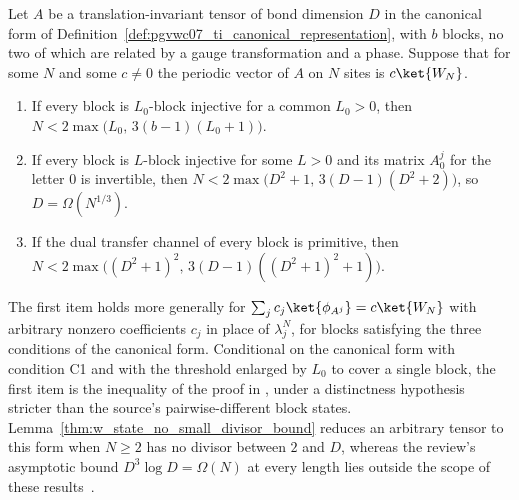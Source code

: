 \begin{lemma}%
    \label{thm:w_state_canonical_bound}
    \leanok
    Let $A$ be a translation-invariant tensor of bond dimension $D$ in the
    canonical form of Definition~\ref{def:pgvwc07_ti_canonical_representation},
    with $b$ blocks, no two of which are related by a gauge transformation and a
    phase. Suppose that for some $N$ and some $c\neq0$ the periodic vector of $A$
    on $N$ sites is $c\ket{W_N}$.
    \begin{enumerate}
        \item If every block is $L_0$-block injective for a common $L_0>0$, then
              $N<2\max\bigl(L_0,\,3(b-1)(L_0+1)\bigr)$.
        \item If every block is $L$-block injective for some $L>0$ and its matrix $A_0^j$ for the letter $0$ is invertible, then
              $N<2\max\bigl(D^2+1,\,3(D-1)(D^2+2)\bigr)$, so $D=\Omega(N^{1/3})$.
        \item If the dual transfer channel of every block is primitive, then
              $N<2\max\bigl((D^2+1)^2,\,3(D-1)((D^2+1)^2+1)\bigr)$.
    \end{enumerate}
    The first item holds more generally for $\sum_jc_j\ket{\phi_{A^j}}=c\ket{W_N}$
    with arbitrary nonzero coefficients $c_j$ in place of $\lambda_j^N$, for blocks
    satisfying the three conditions of the canonical form.
    Conditional on the canonical form with condition C1 and with the threshold
    enlarged by $L_0$ to cover a single block, the first item is the
    inequality of the proof in \cite{PerezGarcia2007Matrix}, under a
    distinctness hypothesis stricter than the source's pairwise-different
    block states. Lemma~\ref{thm:w_state_no_small_divisor_bound} reduces an
    arbitrary tensor to this form when $N\geq2$ has no divisor between $2$ and
    $D$, whereas the review's asymptotic bound $D^3\log D=\Omega(N)$ at every
    length lies outside the scope of these
    results~\cite{gap:rmp_w_state_ti_bound}.
\end{lemma}

